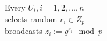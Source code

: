 \documentclass[varwidth,convert={size=1000x}]{standalone}
\begin{document}
Every $U_i, i = 1, 2, \dots, n$\\
selects random $r_i \in Z_p$\\
broadcasts $z_i := g^{r_i} \mod p$
\end{document}
